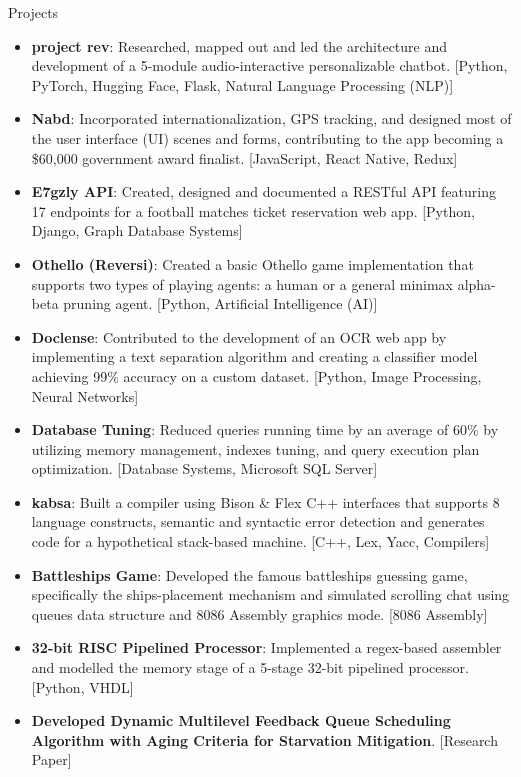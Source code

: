 \documentclass[]{mcdowellcv}
\begin{document}
	\begin{cvsection}{Projects}
		\begin{cvsubsection}{}{}{}
			\begin{itemize}
				\item \textbf{project rev}: Researched, mapped out and led the architecture and development of a 5-module audio-interactive personalizable chatbot. [Python, PyTorch, Hugging Face, Flask, Natural Language Processing (NLP)]
				\item \textbf{Nabd}: Incorporated internationalization, GPS tracking, and designed most of the user interface (UI) scenes and forms, contributing to the app becoming a \$60,000 government award finalist. [JavaScript, React Native, Redux]
				\item \textbf{E7gzly API}: Created, designed and documented a RESTful API featuring 17 endpoints for a football matches ticket reservation web app. [Python, Django, Graph Database Systems]
				\item \textbf{Othello (Reversi)}: Created a basic Othello game implementation that supports two types of playing agents: a human or a general minimax alpha-beta pruning agent. [Python, Artificial Intelligence (AI)]
				\item \textbf{Doclense}: Contributed to the development of an OCR web app by implementing a text separation algorithm and creating a classifier model achieving 99\% accuracy on a custom dataset. [Python, Image Processing, Neural Networks]
				\item \textbf{Database Tuning}: Reduced queries running time by an average of 60\% by utilizing memory management, indexes tuning, and query execution plan optimization. [Database Systems, Microsoft SQL Server]
				\item \textbf{kabsa}: Built a compiler using Bison \& Flex C++ interfaces that supports 8 language constructs, semantic and syntactic error detection and generates code for a hypothetical stack-based machine. [C++, Lex, Yacc, Compilers]
				\item \textbf{Battleships Game}: Developed the famous battleships guessing game, specifically the ships-placement mechanism and simulated scrolling chat using queues data structure and 8086 Assembly graphics mode. [8086 Assembly]
				\item \textbf{32-bit RISC Pipelined Processor}: Implemented a regex-based assembler and modelled the memory stage of a 5-stage 32-bit pipelined processor. [Python, VHDL]
				\item \textbf{Developed Dynamic Multilevel Feedback Queue Scheduling Algorithm with Aging Criteria for Starvation Mitigation}. [Research Paper]
			\end{itemize}
		\end{cvsubsection}
	\end{cvsection}
	
\end{document}
